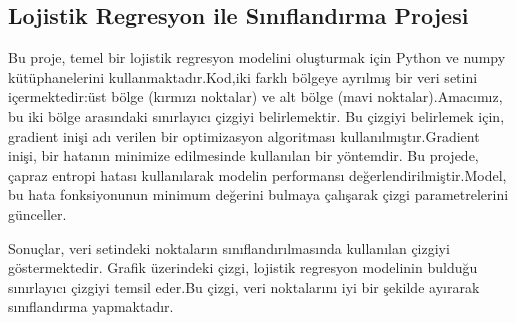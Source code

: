 \documentclass{article}
\begin{document}
\subsection{Lojistik Regresyon ile Sınıflandırma Projesi}
Bu proje, temel bir lojistik regresyon modelini oluşturmak için Python ve numpy kütüphanelerini kullanmaktadır.Kod,iki farklı bölgeye ayrılmış bir veri setini içermektedir:üst bölge (kırmızı noktalar) ve alt bölge (mavi noktalar).Amacımız, bu iki bölge arasındaki sınırlayıcı çizgiyi belirlemektir. Bu çizgiyi belirlemek için, gradient inişi adı verilen bir optimizasyon algoritması kullanılmıştır.Gradient inişi, bir hatanın minimize edilmesinde kullanılan bir yöntemdir. Bu projede, çapraz entropi hatası kullanılarak modelin performansı değerlendirilmiştir.Model, bu hata fonksiyonunun minimum değerini bulmaya çalışarak çizgi parametrelerini günceller.

\noindent Sonuçlar, veri setindeki noktaların sınıflandırılmasında kullanılan çizgiyi göstermektedir. Grafik üzerindeki çizgi, lojistik regresyon modelinin bulduğu sınırlayıcı çizgiyi temsil eder.Bu çizgi, veri noktalarını iyi bir şekilde ayırarak sınıflandırma yapmaktadır.
\end{document}
